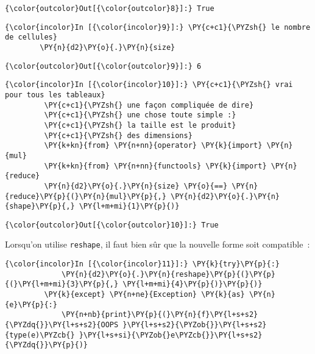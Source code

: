 \begin{Verbatim}[commandchars=\\\{\}]
{\color{outcolor}Out[{\color{outcolor}8}]:} True
\end{Verbatim}
            
    \begin{Verbatim}[commandchars=\\\{\}]
{\color{incolor}In [{\color{incolor}9}]:} \PY{c+c1}{\PYZsh{} le nombre de cellules}
        \PY{n}{d2}\PY{o}{.}\PY{n}{size}
\end{Verbatim}


\begin{Verbatim}[commandchars=\\\{\}]
{\color{outcolor}Out[{\color{outcolor}9}]:} 6
\end{Verbatim}
            
    \begin{Verbatim}[commandchars=\\\{\}]
{\color{incolor}In [{\color{incolor}10}]:} \PY{c+c1}{\PYZsh{} vrai pour tous les tableaux}
         \PY{c+c1}{\PYZsh{} une façon compliquée de dire}
         \PY{c+c1}{\PYZsh{} une chose toute simple :}
         \PY{c+c1}{\PYZsh{} la taille est le produit}
         \PY{c+c1}{\PYZsh{} des dimensions}
         \PY{k+kn}{from} \PY{n+nn}{operator} \PY{k}{import} \PY{n}{mul}
         \PY{k+kn}{from} \PY{n+nn}{functools} \PY{k}{import} \PY{n}{reduce}
         \PY{n}{d2}\PY{o}{.}\PY{n}{size} \PY{o}{==} \PY{n}{reduce}\PY{p}{(}\PY{n}{mul}\PY{p}{,} \PY{n}{d2}\PY{o}{.}\PY{n}{shape}\PY{p}{,} \PY{l+m+mi}{1}\PY{p}{)}
\end{Verbatim}


\begin{Verbatim}[commandchars=\\\{\}]
{\color{outcolor}Out[{\color{outcolor}10}]:} True
\end{Verbatim}
            
    Lorsqu'on utilise \texttt{reshape}, il faut bien sûr que la nouvelle
forme soit compatible~:

    \begin{Verbatim}[commandchars=\\\{\}]
{\color{incolor}In [{\color{incolor}11}]:} \PY{k}{try}\PY{p}{:}
             \PY{n}{d2}\PY{o}{.}\PY{n}{reshape}\PY{p}{(}\PY{p}{(}\PY{l+m+mi}{3}\PY{p}{,} \PY{l+m+mi}{4}\PY{p}{)}\PY{p}{)}
         \PY{k}{except} \PY{n+ne}{Exception} \PY{k}{as} \PY{n}{e}\PY{p}{:}
             \PY{n+nb}{print}\PY{p}{(}\PY{n}{f}\PY{l+s+s2}{\PYZdq{}}\PY{l+s+s2}{OOPS }\PY{l+s+s2}{\PYZob{}}\PY{l+s+s2}{type(e)\PYZcb{} }\PY{l+s+si}{\PYZob{}e\PYZcb{}}\PY{l+s+s2}{\PYZdq{}}\PY{p}{)}
\end{Verbatim}


